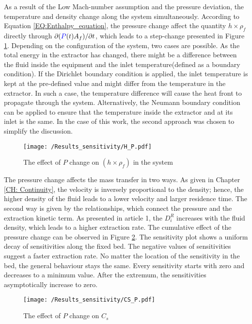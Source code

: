 \documentclass[../Article_Model_Parameters.tex]{subfiles}
\begin{document}
	As a result of the Low Mach-number assumption and the pressure deviation, the temperature and density change along the system simultaneously. According to Equation \ref{EQ:Enthalpy_equation}, the pressure change affect the quantity $h \times \rho_f$ directly through $\partial ({\color{blue}P}(t) A_f) / \partial t$, which leads to a step-change presented in Figure \ref{fig:Sensitivty_P_H}. Depending on the configuration of the system, two cases are possible. As the total energy in the extractor has changed, there might be a difference between the fluid inside the equipment and the inlet temperature(defined as a boundary condition). If the Dirichlet boundary condition is applied, the inlet temperature is kept at the pre-defined value and might differ from the temperature in the extractor. In such a case, the temperature difference will cause the heat front to propagate through the system. Alternatively, the Neumann boundary condition can be applied to ensure that the temperature inside the extractor and at its inlet is the same. In the case of this work, the second approach was chosen to simplify the discussion.
    
    \begin{figure}[h!]
    	\centering
    	\texttt{[image: /Results\_sensitivity/H\_P.pdf]}
    	\caption{The effect of $P$ change on $(h \times \rho_f)$ in the system}
    	\label{fig:Sensitivty_P_H}
    \end{figure}

	The pressure change affects the mass transfer in two ways. As given in Chapter \ref{CH: Continuity}, the velocity is inversely proportional to the density; hence, the higher density of the fluid leads to a lower velocity and larger residence time. The second way is given by the relationships, which connect the pressure and the extraction kinetic term. As presented in {\color{red}article 1}, the $D_i^R$ increases with the fluid density, which leads to a higher extraction rate. The cumulative effect of the pressure change can be observed in Figure \ref{fig:Sensitivty_P_CS}. The sensitivity plot shows a uniform decay of sensitivities along the fixed bed. The negative values of sensitivities suggest a faster extraction rate. No matter the location of the sensitivity in the bed, the general behaviour stays the same. Every sensitivity starts with zero and decreases to a minimum value. After the extremum, the sensitivities asymptotically increase to zero.

	\begin{figure}[h!]
		\centering
		\texttt{[image: /Results\_sensitivity/CS\_P.pdf]}
		\caption{The effect of $P$ change on $C_s$}
		\label{fig:Sensitivty_P_CS}
	\end{figure}
\end{document}
